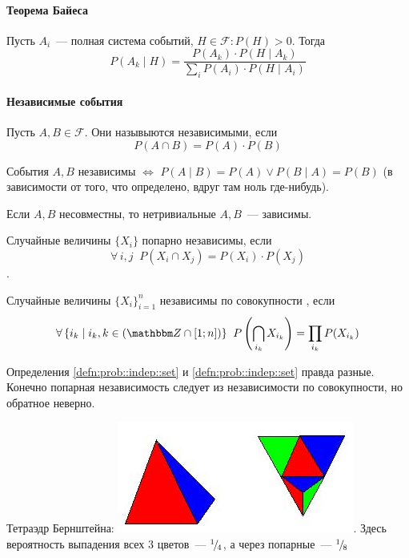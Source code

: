 \documentclass[12pt,hardcopy]{../../../notes}
\begin{document}
\paragraph{Теорема Байеса}
\label{par:prob::bayes}

\begin{thrm}\label{thrm:prob::bayes}
  Пусть $A_i$~--- полная система событий, $H\in \mathcal F\colon P(H)>0$. Тогда 
  \[
    P(A_k \mid H) = \frac{P(A_k)\cdot P(H \mid A_k)}{\sum_i P(A_i)\cdot P(H\mid A_i)} 
  \]
\end{thrm}

\paragraph{Независимые события}
\label{par:prob::indep}

\begin{defn}\label{defn:prob::indep::indep}
  Пусть $A, B\in \mathcal F$. Они назывыются независимыми, если 
  \[
    P(A\cap B) = P(A)\cdot P(B)
  \]
\end{defn}

\begin{prop}\label{prop:prob::indep::cond}
  События $A,B$ независимы $ \Leftrightarrow $ $P(A\mid B) = P(A) \lor P(B\mid A) = P(B)$ (в
  зависимости от того, что определено, вдруг там ноль где-нибудь).
\end{prop}
\begin{prop}\label{prop:prob::indep::zerodep}
  Если $A,B$ несовместны, то нетривиальные $A,B$~--- зависимы.
\end{prop}

\begin{defn}\label{defn:prob::indep::pair}
  Случайные величины $\{X_i\}$ попарно независимы, если 
  \[\forall\,i,j\;\; P(X_i\cap X_j) = P(X_i)\cdot P(X_j)\]. 
\end{defn}
\begin{defn}\label{defn:prob::indep::set}
  Случайные величины $\{X_i\}_{i=1}^n$ независимы по совокупности , если \[
    \forall\,\{i_k\mid i_k,k \in (\Z\cap[1;n]) \}\;\; P\left(\bigcap_{i_k} X_{i_k}\right) 
    = \prod_{i_k}  P(X_{i_k})
  \] 
\end{defn}
\begin{rem}\label{rem:prob::indep::bern}
  Определения \ref{defn:prob::indep::set} и \ref{defn:prob::indep::set} правда разные.
  Конечно попарная независимость следует из независимости по совокупности, но обратное неверно.
\end{rem}
\begin{exmp}\label{exmp:stat::shwartz::bern}
  Тетраэдр Бернштейна:
  \includegraphics[scale=0.5]{berntetragon}. Здесь вероятность выпадения всех 3 цветов~--- ${}^{1}\!/_{\!4}$, а через попарные~--- ${}^{1}\!/_{\!8}$
\end{exmp}
\end{document}
